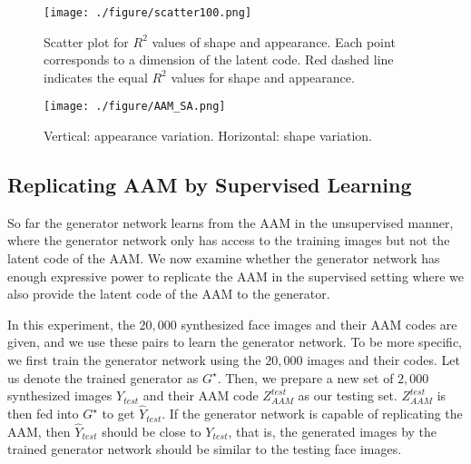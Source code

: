 \documentclass{article}
\begin{document}
\begin{figure}[h]
	\begin{center}
		\texttt{[image: ./figure/scatter100.png]}		
		\caption{Scatter plot for $R^2$ values of shape and appearance. Each point corresponds to a dimension of the latent code. Red dashed line indicates the equal $R^2$ values for shape and appearance. }
		\label{fig:scatterSA}
	\end{center}
\end{figure}

\begin{figure}[h]
	\begin{center}
		\texttt{[image: ./figure/AAM\_SA.png]}		
		\caption{Vertical: appearance variation. Horizontal: shape variation.}
		\label{fig:AAM_variation}
	\end{center}
\end{figure}

\subsection{Replicating AAM by Supervised Learning}

So far the generator network learns from the AAM in the unsupervised manner, where the generator network only has access to the training images but not the latent code of the AAM. 
 We now examine whether the generator network has enough expressive power to replicate the AAM in the supervised setting where we also provide the latent code of the AAM to the generator. 

In this experiment, the $20,000$ synthesized face images and their AAM codes are given, and we use these pairs to learn the generator network. To be more specific, we first train the generator network using the $20,000$ images and their codes. Let us denote the trained generator as $G^\star$. Then, we prepare a new set of $2,000$ synthesized images $Y_{test}$ and their AAM code $Z^{test}_{AAM}$ as our testing set. $Z^{test}_{AAM}$ is then fed into $G^\star$ to get $\hat{Y}_{test}$. If the generator network is capable of replicating the AAM, then $\hat{Y}_{test}$ should be close to $Y_{test}$, that is, the generated images by the trained generator network should be similar to the testing face images. 
\end{document}

